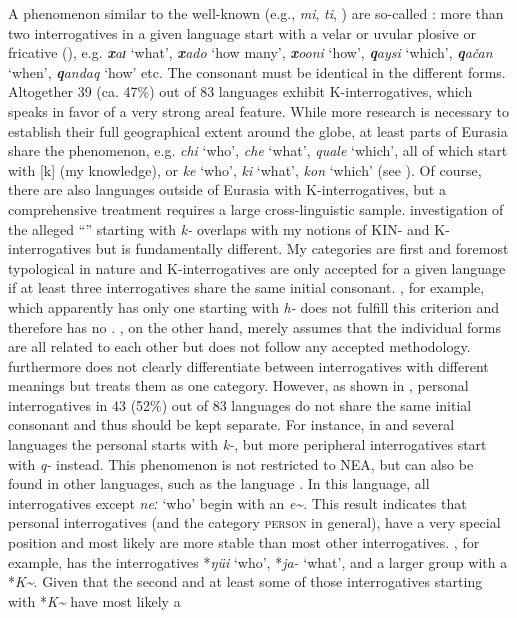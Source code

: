 A phenomenon similar to the well-known  (e.g.,  \textit{mi}, \textit{ti}, \citealt{NicholsPeterson2013}) are so-called : more than two interrogatives in a given language start with a velar or uvular plosive or fricative (), e.g.  \textbf{\textit{x}}\textit{aɪ} ‘what’, \textbf{\textit{x}}\textit{ado} ‘how many’, \textbf{\textit{x}}\textit{ooni} ‘how’,  \textbf{\textit{q}}\textit{aysi} ‘which’, \textbf{\textit{q}}\textit{ačan} ‘when’, \textbf{\textit{q}}\textit{andaq} ‘how’ etc. The consonant must be identical in the different forms. Altogether 39 (ca. 47\%) out of 83 languages exhibit K-interrogatives, which speaks in favor of a very strong areal feature. While more research is necessary to establish their full geographical extent around the globe, at least parts of Eurasia share the phenomenon, e.g.  \textit{chi} ‘who’, \textit{che} ‘what’, \textit{quale} ‘which’, all of which start with [k] (my knowledge), or  \textit{ke} ‘who’, \textit{ki} ‘what’, \textit{kon} ‘which’ \citep[202]{Thompson2012} (see ). Of course, there are also languages outside of Eurasia with K-interrogatives, but a comprehensive treatment requires a large cross-linguistic sample.  investigation of the alleged “”  starting with \textit{k-} overlaps with my notions of KIN- and K-interrogatives but is fundamentally different. My categories are first and foremost typological in nature and K-interrogatives are only accepted for a given language if at least three interrogatives share the same initial consonant. , for example, which apparently has only one  starting with \textit{h-} does not fulfill this criterion and therefore has no . \citet{Greenberg2000}, on the other hand, merely assumes that the individual forms are all related to each other but does not follow any accepted methodology. \citet{Greenberg2000} furthermore does not clearly differentiate between interrogatives with different meanings but treats them as one category. However, as shown in , personal interrogatives in 43 (52\%) out of 83 languages do not share the same initial consonant and thus should be kept separate. For instance, in  and several  languages the personal  starts with \textit{k-}, but more peripheral interrogatives start with \textit{q-} instead. This phenomenon is not restricted to NEA, but can also be found in other languages, such as the  language  \citep[91]{Kobayashi2017}. In this language, all interrogatives except \textit{neː} ‘who’ begin with an \textit{e{\textasciitilde}}. This result indicates that personal interrogatives (and the category \textsc{person} in general), have a very special position and most likely are more stable than most other interrogatives. , for example, has the interrogatives *\textit{ŋüi} ‘who’, *\textit{ja-} ‘what’, and a larger group with a  *\textit{K{\textasciitilde}}. Given that the second and at least some of those interrogatives starting with *\textit{K{\textasciitilde}} have most likely a  